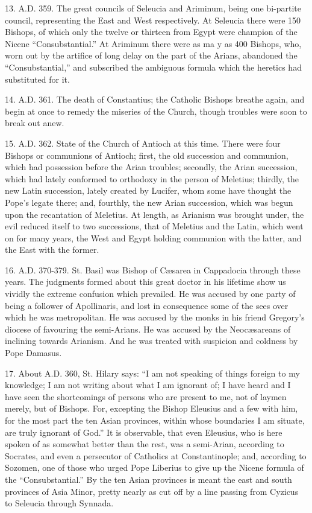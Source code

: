 13. A.D.
359. The great councils of Seleucia and Ariminum, being one bi-partite
council, representing the East and West respectively. At Seleucia there
were 150 Bishops, of which only the twelve or thirteen from Egypt were
champion of the Nicene ``Consubstantial.'' At Ariminum there were as ma y
as 400 Bishops, who, worn out by the artifice of long delay on the
part of the Arians, abandoned the ``Consubstantial,'' and subscribed the
ambiguous formula which the heretics had substituted for it.

14. A.D.
361. The death of Constantius; the Catholic Bishops breathe again, and
begin at once to remedy the miseries of the Church, though troubles were
soon to break out anew.

15. A.D.
362. State of the Church of Antioch at this time. There were four
Bishops or communions of Antioch; first, the old succession and
communion, which had possession before the Arian troubles; secondly, the
Arian succession, which had lately conformed to orthodoxy in the person
of Meletius; thirdly, the new Latin succession, lately created by
Lucifer, whom some have thought the Pope's legate there; and, fourthly,
the new Arian succession, which was begun upon the recantation of
Meletius. At length, as Arianism was brought under, the evil reduced
itself to two successions, that of Meletius and the Latin, which went on
for many years, the West and Egypt holding communion with the latter,
and the East with the former.

16. A.D.
370-379. St. Basil was Bishop of Cæsarea in Cappadocia through these
years. The judgments formed about this great doctor in his lifetime show
us vividly the extreme confusion which prevailed. He was accused by one
party of being a follower of Apollinaris, and lost in consequence some
of the sees over which he was metropolitan. He was accused by the monks
in his friend Gregory's diocese of favouring the semi-Arians. He was
accused by the Neocæsareans of inclining towards Arianism. And he was
treated with suspicion and coldness by Pope Damasus.

17. About A.D. 360, St. Hilary says: ``I am not speaking of things foreign
to my knowledge; I am not writing about what I am ignorant of; I have
heard and I have seen the shortcomings of persons who are present to me,
not of laymen merely, but of Bishops. For, excepting the Bishop Eleusius
and a few with him, for the most part the ten Asian provinces, within
whose boundaries I am situate, are truly ignorant of God.'' It is
observable, that even Eleusius, who is here spoken of as somewhat better
than the rest, was a semi-Arian, according to Socrates, and even a
persecutor of Catholics at Constantinople; and, according to Sozomen,
one of those who urged Pope Liberius to give up the Nicene formula of
the ``Consubstantial.'' By the ten Asian provinces is meant the east and
south provinces of Asia Minor, pretty nearly as cut off by a line
passing from Cyzicus to Seleucia through Synnada.

